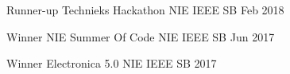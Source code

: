 


\begin{cvhonors}

  \cvhonor
    {Runner-up} %
    {Technieks Hackathon} %
    {NIE IEEE SB} %
    {Feb 2018} %

  \cvhonor
    { Winner} %
    {NIE Summer Of Code} %
    {NIE IEEE SB} %
    {Jun 2017} %

  \cvhonor
    {Winner} %
    {Electronica 5.0} %
    {NIE IEEE SB} %
    {2017} %

\end{cvhonors}




